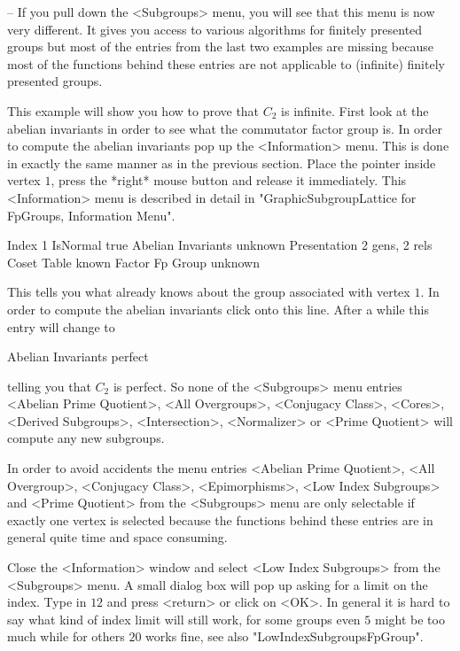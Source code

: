 -- If you pull down the <Subgroups> menu, you will see  that this menu is
now   very different.   It gives  you   access to various algorithms  for
finitely presented  groups  but most of  the  entries  from the last  two
examples  are missing because most of  the {\GAP}  functions behind these
entries are not applicable to (infinite) finitely presented groups.

This  example will show  you how to prove that  $C_2$ is infinite.  First
look at the abelian invariants in order to see what the commutator factor
group is.   In  order  to  compute the abelian    invariants pop  up  the
<Information> menu.   This is done in exactly  the same manner  as in the
previous section.  Place the pointer inside vertex $1$, press the *right*
mouse button and release   it  immediately.  This <Information> menu   is
described  in   detail in  "GraphicSubgroupLattice  for FpGroups, Information
Menu".

\begintt
Index                  1
IsNormal               true
Abelian Invariants     unknown
Presentation           2 gens, 2 rels
Coset Table            known
Factor Fp Group        unknown 
\endtt

This tells you what {\GAP} already knows  about the group associated with
vertex $1$.   In order to compute the  abelian invariants click onto this
line.  After a while this entry will change to

\begintt
Abelian Invariants     perfect 
\endtt

telling you  that $C_2$  is perfect.   So none   of the  <Subgroups> menu
entries <Abelian  Prime Quotient>,  <All Overgroups>,  <Conjugacy Class>,
<Cores>,  <Derived Subgroups>,  <Intersection>,   <Normalizer> or  <Prime
Quotient> will compute any new subgroups.

In order  to avoid accidents  the menu entries  <Abelian Prime Quotient>,
<All Overgroup>, <Conjugacy Class>, <Epimorphisms>, <Low Index Subgroups>
and  <Prime  Quotient> from the  <Subgroups>  menu are only selectable if
exactly one vertex is selected because the functions behind these entries
are in general quite time and space consuming.

Close the <Information> window and select <Low  Index Subgroups> from the
<Subgroups> menu.  A small dialog box will  pop up asking  for a limit on
the index.  Type in $12$ and press <return> or click on <OK>.  In general
it  is hard to say what   kind of index  limit  will still work, for some
groups even $5$ might be too  much while for others  $20$ works fine, see
also "LowIndexSubgroupsFpGroup".

